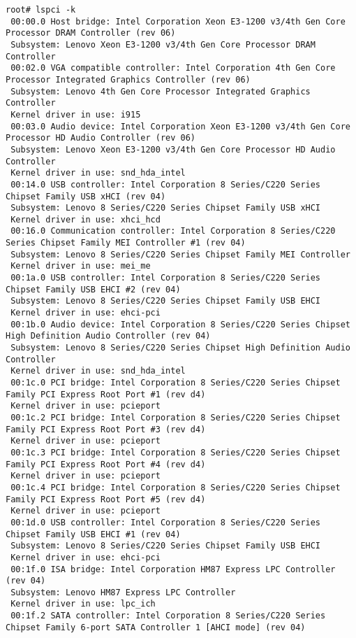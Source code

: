 \documentclass[10pt,a4paper]{article}
\begin{document}
                \begin{lstlisting}[style=BashInputRoot]
 root# lspci -k 
 00:00.0 Host bridge: Intel Corporation Xeon E3-1200 v3/4th Gen Core Processor DRAM Controller (rev 06)
 Subsystem: Lenovo Xeon E3-1200 v3/4th Gen Core Processor DRAM Controller
 00:02.0 VGA compatible controller: Intel Corporation 4th Gen Core Processor Integrated Graphics Controller (rev 06)
 Subsystem: Lenovo 4th Gen Core Processor Integrated Graphics Controller
 Kernel driver in use: i915
 00:03.0 Audio device: Intel Corporation Xeon E3-1200 v3/4th Gen Core Processor HD Audio Controller (rev 06)
 Subsystem: Lenovo Xeon E3-1200 v3/4th Gen Core Processor HD Audio Controller
 Kernel driver in use: snd_hda_intel
 00:14.0 USB controller: Intel Corporation 8 Series/C220 Series Chipset Family USB xHCI (rev 04)
 Subsystem: Lenovo 8 Series/C220 Series Chipset Family USB xHCI
 Kernel driver in use: xhci_hcd
 00:16.0 Communication controller: Intel Corporation 8 Series/C220 Series Chipset Family MEI Controller #1 (rev 04)
 Subsystem: Lenovo 8 Series/C220 Series Chipset Family MEI Controller
 Kernel driver in use: mei_me
 00:1a.0 USB controller: Intel Corporation 8 Series/C220 Series Chipset Family USB EHCI #2 (rev 04)
 Subsystem: Lenovo 8 Series/C220 Series Chipset Family USB EHCI
 Kernel driver in use: ehci-pci
 00:1b.0 Audio device: Intel Corporation 8 Series/C220 Series Chipset High Definition Audio Controller (rev 04)
 Subsystem: Lenovo 8 Series/C220 Series Chipset High Definition Audio Controller
 Kernel driver in use: snd_hda_intel
 00:1c.0 PCI bridge: Intel Corporation 8 Series/C220 Series Chipset Family PCI Express Root Port #1 (rev d4)
 Kernel driver in use: pcieport
 00:1c.2 PCI bridge: Intel Corporation 8 Series/C220 Series Chipset Family PCI Express Root Port #3 (rev d4)
 Kernel driver in use: pcieport
 00:1c.3 PCI bridge: Intel Corporation 8 Series/C220 Series Chipset Family PCI Express Root Port #4 (rev d4)
 Kernel driver in use: pcieport
 00:1c.4 PCI bridge: Intel Corporation 8 Series/C220 Series Chipset Family PCI Express Root Port #5 (rev d4)
 Kernel driver in use: pcieport
 00:1d.0 USB controller: Intel Corporation 8 Series/C220 Series Chipset Family USB EHCI #1 (rev 04)
 Subsystem: Lenovo 8 Series/C220 Series Chipset Family USB EHCI
 Kernel driver in use: ehci-pci
 00:1f.0 ISA bridge: Intel Corporation HM87 Express LPC Controller (rev 04)
 Subsystem: Lenovo HM87 Express LPC Controller
 Kernel driver in use: lpc_ich
 00:1f.2 SATA controller: Intel Corporation 8 Series/C220 Series Chipset Family 6-port SATA Controller 1 [AHCI mode] (rev 04)

\end{lstlisting}
\end{document}
